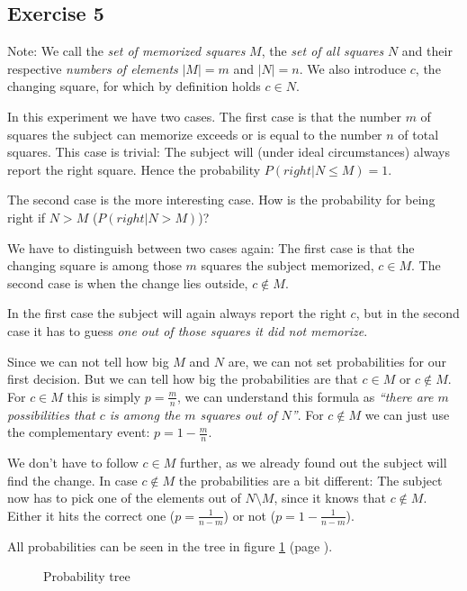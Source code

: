 \subsection*{Exercise 5}
\footnotesize{ 
Note: We call the \textit{set of memorized squares} $M$, the 
\textit{set of all squares} $N$ and their respective \textit{numbers of elements} 
$|M| = m$ and $|N| = n$. We also introduce $c$, the changing square, for which 
by definition holds $c \in N$.}

In this experiment we have two cases. The first case is that the number $m$ of 
squares the subject can memorize exceeds or is equal to the number $n$ of total 
squares. This case is trivial: The subject will (under ideal circumstances) 
always report the right square. Hence the probability $P(right | N \leq M) = 1$.

The second case is the more interesting case. How is the probability for being 
right if $N > M$ ($P(right | N > M)$)?

We have to distinguish between two cases again: The first case is that the 
changing square is among those $m$ squares the subject memorized, $c \in M$. 
The second case is when the change lies outside, $c \notin M$.

In the first case the subject will again always report the right $c$, but in the
second case it has to guess \textit{one out of those squares it did not memorize}.

Since we can not tell how big $M$ and $N$ are, we can not set probabilities for 
our first decision. But we can tell how big the probabilities are that $c \in M$ 
or $c \notin M$. For $c \in M$ this is simply $p = \frac{m}{n}$, we can understand 
this formula as \textit{``there are $m$ possibilities that $c$ is among the $m$ 
squares out of $N$''}. For $c \notin M$ we can just use the complementary event:
$p = 1 - \frac{m}{n}$.

We don't have to follow $c \in M$ further, as we already found out the subject 
will find the change. In case $c \notin M$ the probabilities are a bit different: 
The subject now has to pick one of the elements out of $N \setminus M$, since it 
knows that $c \notin M$. Either it hits the correct one ($p = \frac{1}{n - m}$)
or not ($p = 1 - \frac{1}{n - m}$).

All probabilities can be seen in the tree in figure \ref{tree} (page \pageref{tree}).

\begin{figure}
  
  \caption{Probability tree}
  \label{tree}
\end{figure}

